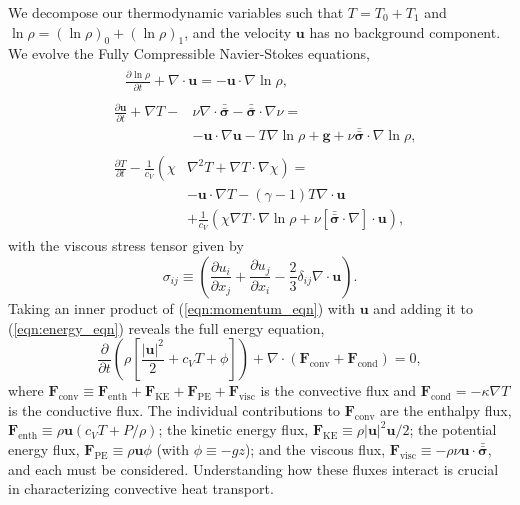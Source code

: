 \documentclass[aps, prl, twocolumn, nofootinbib, groupedaddress, amsfonts, amssymb, amsmath]{revtex4-1}
\newcommand{\Div}[1]{\ensuremath{\nabla\cdot\left( #1\right)}}
\newcommand{\grad}{\ensuremath{\nabla}}
\newcommand{\lilstressT}{\ensuremath{\bm{\bar{\bar{\sigma}}}}}
\begin{document}
We decompose our thermodynamic variables such that $T = T_0 + T_1$ and
$\ln\rho = (\ln\rho)_0 + (\ln\rho)_1$, and the velocity $\bm{u}$ has no
background component.    We evolve the Fully Compressible Navier-Stokes equations,
\begin{align}
&\begin{aligned}
&\frac{\partial \ln\rho}{\partial t} + \grad\cdot\bm{u} 
    = -\bm{u}\cdot\grad\ln\rho,
	\label{eqn:continuity_eqn}
\end{aligned}\\
&\begin{aligned}
\frac{\partial\bm{u}}{\partial t} + \grad T - 
&\nu\grad\cdot\lilstressT - \lilstressT\cdot\grad\nu = \\
&-\bm{u}\cdot\grad\bm{u} - T\grad\ln\rho + \bm{g} + 
\nu\lilstressT\cdot\grad\ln\rho,
\label{eqn:momentum_eqn}
\end{aligned}\\
&\begin{aligned}
\frac{\partial T}{\partial t} -\frac{1}{c_V}\left(\right.\chi&\left.
    \grad^2 T + \grad T\cdot\grad\chi\right) = \\
	&-\bm{u}\cdot\grad T - (\gamma-1)T\grad\cdot{\bm{u}} \\
	&+ \frac{1}{c_V}\left(\chi\grad T \cdot\grad\ln\rho +
	\nu\left[\lilstressT\cdot\nabla\right]\cdot\bm{u}\right), 
	\label{eqn:energy_eqn}
\end{aligned}
\end{align}
with the viscous stress tensor given by
\begin{equation}
\sigma_{ij} \equiv \left(\frac{\partial u_i}{\partial x_j} + 
\frac{\partial u_j}{\partial x_i} - \frac{2}{3}\delta_{ij}\grad\cdot\bm{u}\right).
	\label{eqn:stress_tensor}
\end{equation}
Taking an inner product of
(\ref{eqn:momentum_eqn}) with $\bm{u}$ and adding it to 
(\ref{eqn:energy_eqn}) reveals the full energy equation,
\begin{equation}
\frac{\partial}{\partial t}\left(\rho\left[\frac{|\bm{u}|^2}{2} + c_V T + \phi\right]\right) +
\Div{\bm{F}_{\text{conv}} + \bm{F}_{\text{cond}}} = 0,
	\label{eqn:energy_eqn_full}
\end{equation}
where
$
\bm{F}_{\text{conv}} \equiv \bm{F}_{\text{enth}} + \bm{F}_{\text{KE}} + \bm{F}_{\text{PE}} + \bm{F}_{\text{visc}}
$
is the convective flux and $\bm{F}_{\text{cond}} = -\kappa \grad T$
is the conductive flux.
The individual contributions to $\bm{F}_{\text{conv}}$ are the enthalpy flux, 
$\bm{F}_{\text{enth}} \equiv \rho\bm{u}(c_V T + P/\rho)$;
the kinetic energy flux, 
$\bm{F}_{\text{KE}} \equiv \rho|\bm{u}|^2\bm{u}/2$;
the potential energy flux,
$\bm{F}_{\text{PE}} \equiv \rho\bm{u}\phi$ (with $\phi \equiv -gz$);
and the viscous flux, 
$\bm{F}_{\text{visc}} \equiv -\rho\nu\bm{u}\cdot\lilstressT$, and each 
must be considered. 
Understanding how these fluxes interact  
is crucial in characterizing convective heat transport.
\end{document}
